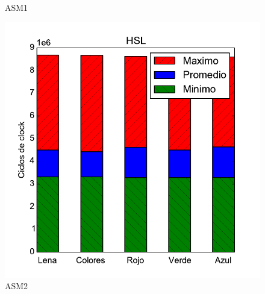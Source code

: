 \begin{figure}[h!]
	\caption{ASM1}
	\includegraphics[scale=0.5]{images/hsl_comparationASM2}
	\caption{ASM2}
\end{figure}

\newpage





